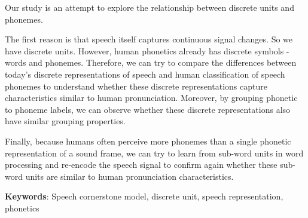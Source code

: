 
        Our study is an attempt to explore the relationship between discrete units and phonemes.

         The first reason is that speech itself captures continuous signal changes. So we have discrete units. However, human phonetics already has discrete symbols - words and phonemes. Therefore, we can try to compare the differences between today's discrete representations of speech and human classification of speech phonemes to understand whether these discrete representations capture characteristics similar to human pronunciation. Moreover, by grouping phonetic to phoneme labels, we can observe whether these discrete representations also have similar grouping properties.

        Finally, because humans often perceive more phonemes than a single phonetic representation of a sound frame, we can try to learn from sub-word units in word processing and re-encode the speech signal to confirm again whether these sub-word units are similar to human pronunciation characteristics.

\textbf{Keywords}: Speech cornerstone model, discrete unit, speech representation, phonetics
